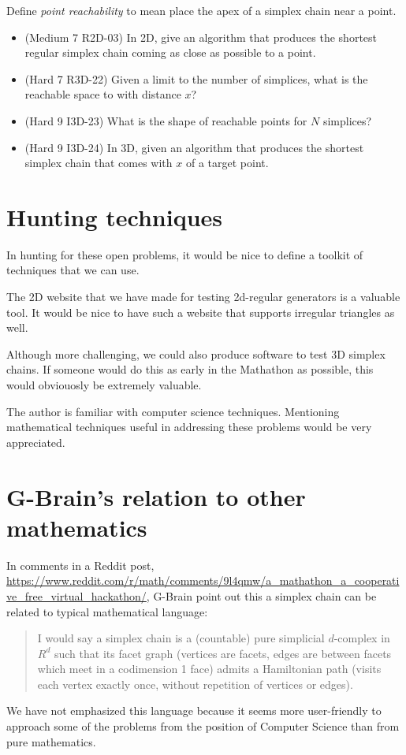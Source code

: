 \documentclass[11pt]{article}
\begin{document}
Define {\em point reachability} to mean place the apex of a simplex chain near a point.
\begin{itemize}
\item  (Medium 7 R2D-03) In 2D, give an algorithm that produces the shortest regular simplex chain coming as close as possible to a point.
\item (Hard 7 R3D-22) Given a limit to the number of simplices, what is the reachable space to with distance $x$?
\item (Hard 9 I3D-23) What is the shape of reachable points for $N$ simplices?
  \item (Hard 9 I3D-24) In 3D, given an algorithm that produces the shortest simplex chain that comes with $x$ of a target point.
  \end{itemize}



\section{Hunting techniques}

In hunting for these open problems, it would be nice to define a toolkit of techniques that we can use.

The 2D website that we have made for testing 2d-regular generators is a valuable tool.
It would be nice to have such a website that supports irregular triangles as well.

Although more challenging, we could also produce software to test 3D simplex chains.
If someone would do this as early in the Mathathon as possible, this would obviouosly be extremely valuable.

The author is familiar with computer science techniques. Mentioning mathematical techniques useful in addressing these problems would be
very appreciated.

\section{G-Brain's relation to other mathematics}

In comments in a Reddit post, \url{https://www.reddit.com/r/math/comments/9l4qmw/a_mathathon_a_cooperative_free_virtual_hackathon/},
G-Brain point out this a simplex chain can be related to typical mathematical language:
\begin{quote}
  I would say a simplex chain is a (countable) pure simplicial $d$-complex in $R^d$ such that its facet graph (vertices are facets, edges are between facets which meet in a codimension 1 face) admits a Hamiltonian path (visits each vertex exactly once, without repetition of vertices or edges).
\end{quote}
We have not emphasized this language because it seems more user-friendly to approach some of the problems from the position of Computer Science than from pure mathematics.
\end{document}
